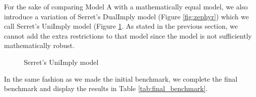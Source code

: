 For the sake of comparing Model A with a mathematically equal model, we also introduce a variation of Serret's DualImply model (Figure \ref{fig:zephyr}) which we call Serret's UniImply model (Figure \ref{fig:uni_imply}. As stated in the previous section, we cannot add the extra restrictions to that model since the model is not sufficiently mathematically robust.

\begin{figure}[H]
    \centering
    \caption{Serret's UniImply model}
    \label{fig:uni_imply}
\end{figure}

In the same fashion as we made the initial benchmark, we complete the final benchmark and display the results in Table \ref{tab:final_benchmark}.

